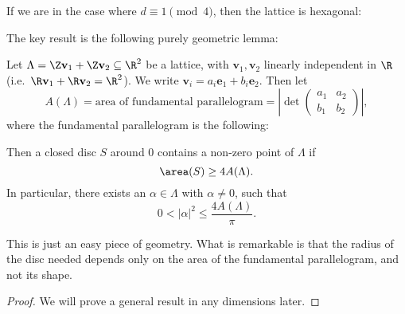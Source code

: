 \documentclass[a4paper]{article}
\begin{document}
If we are in the case where $d \equiv 1 \pmod 4$, then the lattice is hexagonal:
\begin{center}
\end{center}
The key result is the following purely geometric lemma:
\begin{lemma}
  Let $\Lambda = \Z \mathbf{v}_1 + \Z \mathbf{v}_2 \subseteq \R^2$ be a lattice, with $\mathbf{v}_1, \mathbf{v}_2$ linearly independent in $\R$ (i.e.\ $\R \mathbf{v}_1 + \R \mathbf{v}_2 = \R^2$). We write $\mathbf{v}_i = a_i \mathbf{e}_1 + b_i \mathbf{e}_2$. Then let
  \[
    A(\Lambda) = \text{area of fundamental parallelogram} = \left|\det
    \begin{pmatrix}
      a_1 & a_2\\
      b_1 & b_2
    \end{pmatrix}\right|,
  \]
  where the fundamental parallelogram is the following:
  \begin{center}
  \end{center}
  Then a closed disc $S$ around $0$ contains a non-zero point of $\Lambda$ if
  \[
    \area(S) \geq 4 A(\Lambda).
  \]
  In particular, there exists an $\alpha \in \Lambda$ with $\alpha \not= 0$, such that
  \[
    0 < |\alpha|^2 \leq \frac{4 A(\Lambda)}{\pi}.
  \]
\end{lemma}
This is just an easy piece of geometry. What is remarkable is that the radius of the disc needed depends only on the area of the fundamental parallelogram, and not its shape.

\begin{proof}
  We will prove a general result in any dimensions later.
\end{proof}
\end{document}
